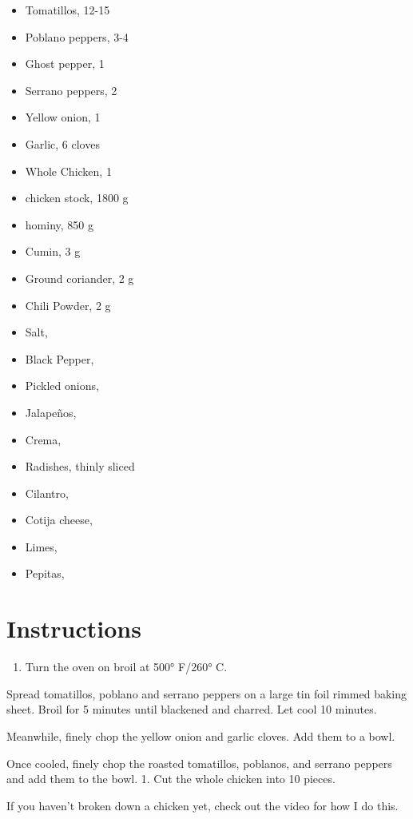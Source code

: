 \documentclass[
  letterpaper,
  DIV=11,
  numbers=noendperiod,
  titlepage=false]{scrreprt}
\providecommand{\tightlist}{%
  \setlength{\itemsep}{0pt}\setlength{\parskip}{0pt}}\usepackage{longtable,booktabs,array}
\begin{document}
\begin{itemize}
\tightlist
\item
  Tomatillos, 12-15
\item
  Poblano peppers, 3-4
\item
  Ghost pepper, 1
\item
  Serrano peppers, 2
\item
  Yellow onion, 1
\item
  Garlic, 6 cloves
\item
  Whole Chicken, 1
\item
  chicken stock, 1800 g
\item
  hominy, 850 g
\item
  Cumin, 3 g
\item
  Ground coriander, 2 g
\item
  Chili Powder, 2 g
\item
  Salt,
\item
  Black Pepper,
\item
  Pickled onions,
\item
  Jalapeños,
\item
  Crema,
\item
  Radishes, thinly sliced
\item
  Cilantro,
\item
  Cotija cheese,
\item
  Limes,
\item
  Pepitas,
\end{itemize}

\section{Instructions}\label{instructions}

\begin{enumerate}
\def\labelenumi{\arabic{enumi}.}
\tightlist
\item
  Turn the oven on broil at 500° F/260° C.
\end{enumerate}

Spread tomatillos, poblano and serrano peppers on a large tin foil
rimmed baking sheet. Broil for 5 minutes until blackened and charred.
Let cool 10 minutes.

Meanwhile, finely chop the yellow onion and garlic cloves. Add them to a
bowl.

Once cooled, finely chop the roasted tomatillos, poblanos, and serrano
peppers and add them to the bowl. 1. Cut the whole chicken into 10
pieces.

If you haven't broken down a chicken yet, check out the video for how I
do this.
\end{document}
